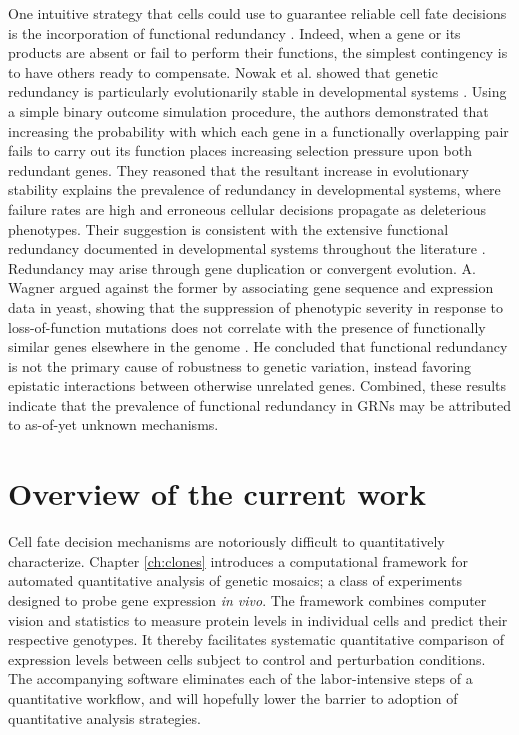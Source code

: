 One intuitive strategy that cells could use to guarantee reliable cell fate decisions is the incorporation of functional redundancy \cite{Hartman2001,McAdams1999}. Indeed, when a gene or its products are absent or fail to perform their functions, the simplest contingency is to have others ready to compensate. Nowak et al. showed that genetic redundancy is particularly evolutionarily stable in developmental systems \cite{Nowak1997}. Using a simple binary outcome simulation procedure, the authors demonstrated that increasing the probability with which each gene in a functionally overlapping pair fails to carry out its function places increasing selection pressure upon both redundant genes. They reasoned that the resultant increase in evolutionary stability explains the prevalence of redundancy in developmental systems, where failure rates are high and erroneous cellular decisions propagate as deleterious phenotypes. Their suggestion is consistent with the extensive functional redundancy documented in developmental systems throughout the literature \cite{Kitano2004}. Redundancy may arise through gene duplication or convergent evolution. A. Wagner argued against the former by associating gene sequence and expression data in yeast, showing that the suppression of phenotypic severity in response to loss-of-function mutations does not correlate with the presence of functionally similar genes elsewhere in the genome \cite{Wagner2000}. He concluded that functional redundancy is not the primary cause of robustness to genetic variation, instead favoring epistatic interactions between otherwise unrelated genes. Combined, these results indicate that the prevalence of functional redundancy in GRNs may be attributed to as-of-yet unknown mechanisms.
 
\section{Overview of the current work}

Cell fate decision mechanisms are notoriously difficult to quantitatively characterize. Chapter \ref{ch:clones} introduces a computational framework for automated quantitative analysis of genetic mosaics; a class of experiments designed to probe gene expression \textit{in vivo}. The framework combines computer vision and statistics to measure protein levels in individual cells and predict their respective genotypes. It thereby facilitates systematic quantitative comparison of expression levels between cells subject to control and perturbation conditions. The accompanying software eliminates each of the labor-intensive steps of a quantitative workflow, and will hopefully lower the barrier to adoption of quantitative analysis strategies. 

